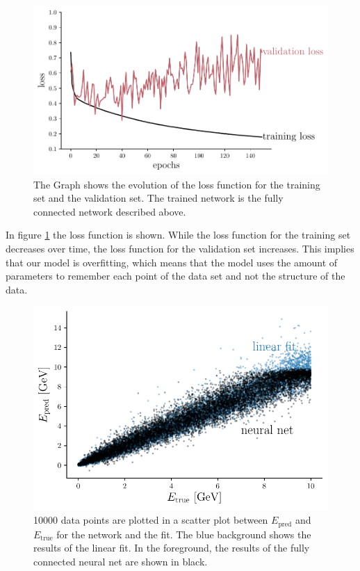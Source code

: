 \documentclass[12pt, a4paper]{thesis}
\begin{document}
\begin{figure}[hbtp]
  \centering
  \includegraphics[width=.9\linewidth]{../images/dense_loss.pdf}
  \caption{The Graph shows the evolution of the loss function for the
    training set and the validation set. The trained network is the
    fully connected network described above.}
  \label{dense_loss}
\end{figure}


In figure \ref{dense_loss} the loss function is shown. While the loss
function for the training set decreases over time, the loss function
for the validation set increases. This implies that our model is
overfitting, which means that the model uses the amount of parameters
to remember each point of the data set and not the structure of the
data.

\begin{figure}[hbtp]
  \centering
  \includegraphics[width=.9\linewidth]{../images/dense_scatter.pdf}
  \caption{ 10000 data points are plotted in a scatter plot between
    \(E_\text{pred}\) and \(E_{\text{true}}\) for the network and the
    fit. The blue background shows the results of the linear fit. In
    the foreground, the results of the fully connected neural net are
    shown in black.}
  \label{dense_scatter}
\end{figure} 
\end{document}
